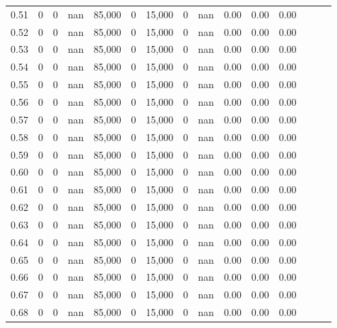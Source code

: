 \begin{tabular}{rrrrrrrrrrrrrrr}
0.51 &      0 &    0 &   nan &  85,000 &       0 &  15,000 &       0 &   nan &  0.00 &  0.00 &      0.00 \\
0.52 &      0 &    0 &   nan &  85,000 &       0 &  15,000 &       0 &   nan &  0.00 &  0.00 &      0.00 \\
0.53 &      0 &    0 &   nan &  85,000 &       0 &  15,000 &       0 &   nan &  0.00 &  0.00 &      0.00 \\
0.54 &      0 &    0 &   nan &  85,000 &       0 &  15,000 &       0 &   nan &  0.00 &  0.00 &      0.00 \\
0.55 &      0 &    0 &   nan &  85,000 &       0 &  15,000 &       0 &   nan &  0.00 &  0.00 &      0.00 \\
0.56 &      0 &    0 &   nan &  85,000 &       0 &  15,000 &       0 &   nan &  0.00 &  0.00 &      0.00 \\
0.57 &      0 &    0 &   nan &  85,000 &       0 &  15,000 &       0 &   nan &  0.00 &  0.00 &      0.00 \\
0.58 &      0 &    0 &   nan &  85,000 &       0 &  15,000 &       0 &   nan &  0.00 &  0.00 &      0.00 \\
0.59 &      0 &    0 &   nan &  85,000 &       0 &  15,000 &       0 &   nan &  0.00 &  0.00 &      0.00 \\
0.60 &      0 &    0 &   nan &  85,000 &       0 &  15,000 &       0 &   nan &  0.00 &  0.00 &      0.00 \\
0.61 &      0 &    0 &   nan &  85,000 &       0 &  15,000 &       0 &   nan &  0.00 &  0.00 &      0.00 \\
0.62 &      0 &    0 &   nan &  85,000 &       0 &  15,000 &       0 &   nan &  0.00 &  0.00 &      0.00 \\
0.63 &      0 &    0 &   nan &  85,000 &       0 &  15,000 &       0 &   nan &  0.00 &  0.00 &      0.00 \\
0.64 &      0 &    0 &   nan &  85,000 &       0 &  15,000 &       0 &   nan &  0.00 &  0.00 &      0.00 \\
0.65 &      0 &    0 &   nan &  85,000 &       0 &  15,000 &       0 &   nan &  0.00 &  0.00 &      0.00 \\
0.66 &      0 &    0 &   nan &  85,000 &       0 &  15,000 &       0 &   nan &  0.00 &  0.00 &      0.00 \\
0.67 &      0 &    0 &   nan &  85,000 &       0 &  15,000 &       0 &   nan &  0.00 &  0.00 &      0.00 \\
0.68 &      0 &    0 &   nan &  85,000 &       0 &  15,000 &       0 &   nan &  0.00 &  0.00 &      0.00 \\

\end{tabular}
